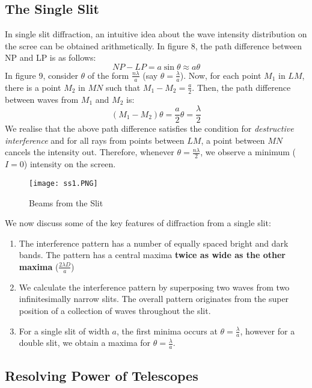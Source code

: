 \documentclass{article}
\begin{document}
\subsection{The Single Slit}
In single slit diffraction, an intuitive idea about the wave intensity distribution on the scree can be obtained arithmetically. In figure 8, the path difference between NP and LP is as follows:
\begin{equation*}
    NP - LP = a\sin{\theta} \approx a\theta
\end{equation*}
In figure 9, consider $\theta$ of the form $\frac{n\lambda}{a}$ (say $\theta = \frac{\lambda}{a}$). Now, for each point $M_{1}$ in $LM$, there is a point $M_{2}$ in $MN$ such that $M_{1} - M_{2} = \frac{a}{2}$. Then, the path difference between waves from $M_{1}$ and $M_{2}$ is:
\begin{equation*}
    (M_{1} - M_{2})\theta = \frac{a}{2}\theta = \frac{\lambda}{2}
\end{equation*}
We realise that the above path difference satisfies the condition for \emph{destructive interference} and for all rays from points between $LM$, a point between $MN$ cancels the intensity out. Therefore, whenever $\theta = \frac{n\lambda}{2}$, we observe a minimum ($I = 0$)  intensity on the screen. 
\begin{figure}[htp]
    \centering
    \texttt{[image: ss1.PNG]}
    \caption{Beams from the Slit}
    \label{fig:y equals x}
\end{figure}
\newpage
We now discuss some of the key features of diffraction from a single slit:
\begin{enumerate}
    \item The interference pattern has a number of equally spaced bright and dark bands. The pattern has a central maxima \textbf{twice as wide as the other maxima }($\frac{2\lambda D}{a}$)
    \item We calculate the interference pattern by superposing two waves from two infinitesimally narrow slits. The overall pattern originates from the super position of a collection of waves throughout the slit. 
    \item For a single slit of width $a$, the first minima occurs at $\theta = \frac{\lambda}{a}$, however for a double slit, we obtain a maxima for $\theta = \frac{\lambda}{a}$. 
\end{enumerate}
\subsection{Resolving Power of Telescopes}
\end{document}
